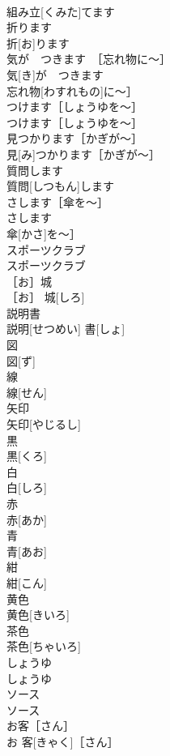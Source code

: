 \documentclass[8pt]{extreport}
\begin{document}
\begin{CJK}{UTF8}{min}
\\	組み立[くみた]てます	
\\	折ります	
\\	折[お]ります	
\\	気が　つきます　［忘れ物に〜］	
\\	気[き]が　つきます　
\\	忘れ物[わすれもの]に〜］	
\\	つけます［しょうゆを〜］	
\\	つけます［しょうゆを〜］	
\\	見つかります［かぎが〜］	
\\	見[み]つかります［かぎが〜］	
\\	質問します	
\\	質問[しつもん]します	
\\	さします［傘を〜］	
\\	さします
\\	傘[かさ]を〜］	
\\	スポーツクラブ	
\\	スポーツクラブ	
\\	［お］城	
\\	［お］ 城[しろ]	
\\	説明書	
\\	説明[せつめい] 書[しょ]	
\\	図	
\\	図[ず]	
\\	線	
\\	線[せん]	
\\	矢印	
\\	矢印[やじるし]	
\\	黒	
\\	黒[くろ]	
\\	白	
\\	白[しろ]	
\\	赤	
\\	赤[あか]	
\\	青	
\\	青[あお]	
\\	紺	
\\	紺[こん]	
\\	黄色	
\\	黄色[きいろ]	
\\	茶色	
\\	茶色[ちゃいろ]	
\\	しょうゆ	
\\	しょうゆ	
\\	ソース	
\\	ソース	
\\	お客［さん］	
\\	お 客[きゃく]［さん］	

\end{CJK}
\end{document}
